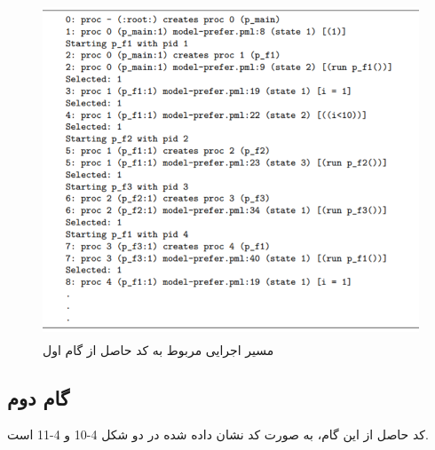  \begin{figure}
	\centering
	\includegraphics[height=10cm,width=15cm]{i.png}
	\caption{مسیر اجرایی مربوط به کد حاصل از گام اول}
	\centering
\end{figure}


\subsection{گام دوم}
کد حاصل از این گام، به صورت کد نشان داده شده در دو شکل 4-10 و 4-11 است.

